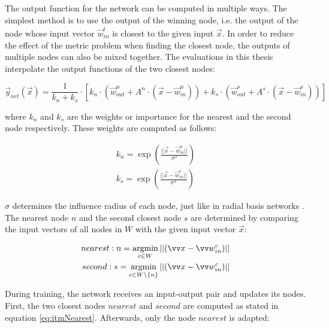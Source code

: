 The output function for the network can be computed in multiple ways. The simplest method is to use the output of the winning node, i.e. the output of the node whose input vector $\vec{w}^i_{in}$ is closest to the given input $\vec{x}$. In order to reduce the effect of the metric problem when finding the closest node, the outputs of multiple nodes can also be mixed together. %
The evaluations in this thesis interpolate the output functions of the two closest nodes:

\begin{equation}
\vec{y}_{net}(\vec{x}) =  \frac{1}{k_n+k_s} \cdot \left[ k_n \cdot \left(\vec{w}^n_{out} + A^n \cdot \left(\vec{x}-\vec{w}^n_{in}\right)\right) + k_s \cdot  \left(\vec{w}^s_{out} + A^s \cdot \left(\vec{x}-\vec{w}^s_{in}\right)\right)\right]
\end{equation}

where $k_n$ and $k_s$ are the weights or importance for the nearest and the second node respectively. These weights are computed as follows:

\begin{equation}
\begin{split}
k_n = \exp\left(\frac{||\vec{x}-\vec{w}^n_{in}||}{\sigma^2}\right) \\
k_s = \exp\left(\frac{||\vec{x}-\vec{w}^s_{in}||}{\sigma^2}\right) 
\end{split}
\end{equation}

$\sigma$ determines the influence radius of each node, just like in radial basis networks \cite{rbf}.
The nearest node $n$ and the second closest node $s$ are determined by comparing the input vectors of all nodes in $W$ with the given input vector $\vec{x}$:

\begin{equation}
\begin{split}
	nearest: n = \argmin_{c\in W} ||(\vec{x} - \vec{w}^c_{in})|| \\
	second: s = \argmin_{c\in W\backslash\{n\}} ||(\vec{x} - \vec{w}^c_{in})||
\end{split}
\label{eq:itmNearest}
\end{equation}

During training, the network receives an input-output pair and updates its nodes. First, the two closest nodes $nearest$ and $second$ are computed as stated in equation \ref{eq:itmNearest}. Afterwards, only the node $nearest$ is adapted:

